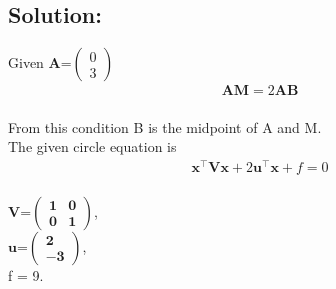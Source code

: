 \documentclass[10pt,a4paper]{report}
\newcommand{\myvec}[1]{\ensuremath{\begin{pmatrix}#1\end{pmatrix}}}
\let\vec\mathbf
\begin{document}
\begin{multicols}{2}
\section*{Solution:}
Given $\vec{A}$=$\myvec{0 \\ 3}$
\vspace{0.25cm}\\
\begin{align}
\vec{A}\vec{M} = 2\vec{A}\vec{B}
\end{align}
\vspace{0.25cm}\\
From this condition B is the midpoint of A and M.
\\
The given circle equation is 
\begin{align}
\vec{x}^{\top}\vec{V}\vec{x}+2\vec{u}^{\top}\vec{x}+f=0
\end{align}
\vspace{0.25cm}\\
$\vec{V}$=$\vec{ \begin{pmatrix}1 & 0 \\ 0 & 1 \end{pmatrix}}$, 
\vspace{0.25cm}\\
$\vec{u}$=$\vec{ \begin{pmatrix}2 \\ -3 \end{pmatrix}}$, 
\vspace{0.25cm}\\
f = 9.


\end{multicols}
\end{document}
